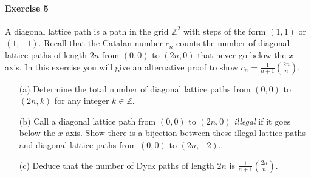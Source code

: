\documentclass[a4paper,12pt]{article}
\begin{document}
\paragraph{Exercise 5}  A diagonal lattice path is a path in the grid $\mathbb{Z}^2$ with steps of the form $(1,1)$ or $(1,-1)$. Recall that the Catalan number $c_n$ counts the number of diagonal lattice paths of length $2n$ from $(0,0)$ to $(2n,0)$ that never go below the $x$-axis.  In this exercise you will give an alternative proof to show $c_n = \frac{1}{n+1} \binom{2n}{n}$.
\begin{itemize}
	\item[(a)] Determine the total number of diagonal lattice paths from $(0,0)$ to $(2n,k)$ for any integer $k \in \mathbb{Z}$.
	\item[(b)] Call a diagonal lattice path from $(0,0)$ to $(2n,0)$ \emph{illegal} if it goes below the $x$-axis.  Show there is a bijection between these illegal lattice paths and diagonal lattice paths from $(0,0)$ to $(2n,-2)$.
	\item[(c)] Deduce that the number of Dyck paths of length $2n$ is $\frac{1}{n+1} \binom{2n}{n}$.
\end{itemize}
\end{document}
